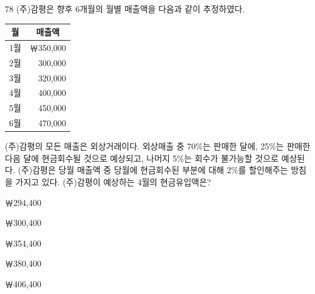 \begin{question}{78}
(주)감평은 향후 6개월의 월별 매출액을 다음과 같이 추정하였다.

{\small\centering\begin{tabular}{|c|r|}\hline
\multicolumn{1}{|c|}{월} & \multicolumn{1}{c|}{매출액} \\ \hline
1월 & ￦350,000 \\ \hline
2월 & 300,000 \\ \hline
3월 & 320,000 \\ \hline
4월 & 400,000 \\ \hline
5월 & 450,000 \\ \hline
6월 & 470,000 \\ \hline
\end{tabular}\par}
\medskip
(주)감평의 모든 매출은 외상거래이다. 외상매출 중 70\%는 판매한 달에, 25\%는 판매한 다음 달에 현금회수될 것으로 예상되고, 나머지 5\%는 회수가 불가능할 것으로 예상된다. (주)감평은 당월 매출액 중 당월에 현금회수된 부분에 대해 2\%를 할인해주는 방침을 가지고 있다. (주)감평이 예상하는 4월의 현금유입액은?
\begin{choices}
  \item ￦294,400
  \item ￦300,400
  \item ￦354,400
  \item ￦380,400
  \item ￦406,400
\end{choices}
\end{question}
